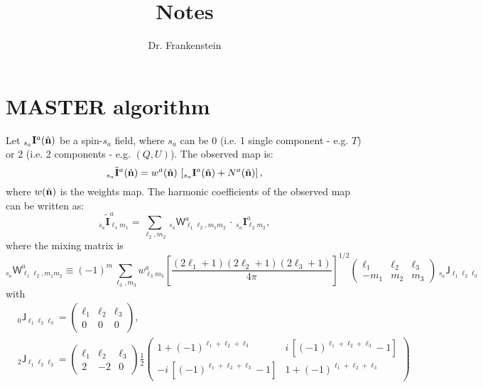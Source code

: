 \documentclass[a4paper,10pt]{article}
\title{Notes}
\author{Dr. Frankenstein}
\newcommand{\nv}{\hat{\bf n}}
\newcommand{\wtj}[6]{\left(\begin{array}{ccc} #1 & #2 & #3\\#4 & #5 & #6\end{array} \right)}
\begin{document}
\maketitle

\section{MASTER algorithm}

Let $_{s_a}\mathbf{I}^a(\nv)$ be a spin-$s_a$ field, where $s_a$ can be 0 (i.e. 1 single component - e.g. $T$) or
2 (i.e. 2 components - e.g. $(Q,U)$). The observed map is:
\begin{equation}
  _{s_a}\tilde{\mathbf{I}}^a(\nv)=w^a(\nv)\,\left[_{s_a}\mathbf{I}^a(\nv)+N^a(\nv)\right],
\end{equation}
where $w(\nv)$ is the weights map. The harmonic coefficients of the observed map
can be written as:
\begin{equation}
  _{s_a}\tilde{\mathbf{I}}^a_{\ell_1 m_1}=\sum_{\ell_2,m_2}\,_{s_a}\mathsf{W}^{a}_{\ell_1\ell_2,m_1m_2}\,\cdot\,_{s_a}\mathbf{I}^a_{\ell_2m_2},
\end{equation}
where the mixing matrix is
\begin{equation}
  _{s_a}\mathsf{W}^a_{\ell_1\ell_2,m_1m_2}\equiv(-1)^m\sum_{\ell_3,m_3}w^a_{\ell_3m_3}\left[\frac{(2\ell_1+1)(2\ell_2+1)(2\ell_3+1)}{4\pi}\right]^{1/2}
  \wtj{\ell_1}{\ell_2}{\ell_3}{-m_1}{m_2}{m_3}\,_{s_a}\mathsf{J}_{\ell_1\ell_2\ell_3}
\end{equation}
with
\begin{align}
 &_0\mathsf{J}_{\ell_1\ell_2\ell_3}=\wtj{\ell_1}{\ell_2}{\ell_3}{0}{0}{0},\\
 &_2\mathsf{J}_{\ell_1\ell_2\ell_3}=\wtj{\ell_1}{\ell_2}{\ell_3}{2}{-2}{0}\frac{1}{2}
 \left(\begin{array}{ll}
   1+(-1)^{\ell_1+\ell_2+\ell_3} & i\,[(-1)^{\ell_1+\ell_2+\ell_3}-1]\\
   -i\,[(-1)^{\ell_1+\ell_2+\ell_3}-1] & 1+(-1)^{\ell_1+\ell_2+\ell_3}
 \end{array}\right)
\end{align}
\end{document}
